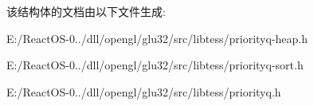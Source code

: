 该结构体的文档由以下文件生成\+:\begin{DoxyCompactItemize}
\item 
E\+:/\+React\+O\+S-\/0../dll/opengl/glu32/src/libtess/priorityq-\/heap.\+h\item 
E\+:/\+React\+O\+S-\/0../dll/opengl/glu32/src/libtess/priorityq-\/sort.\+h\item 
E\+:/\+React\+O\+S-\/0../dll/opengl/glu32/src/libtess/priorityq.\+h\end{DoxyCompactItemize}
